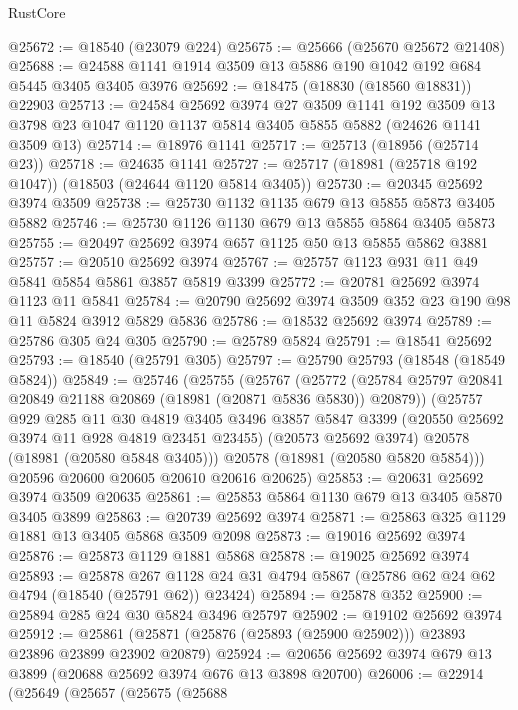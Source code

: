 \begin{lexlean}{RustCore}
\begin{coremodule}
@25672 := @18540 (@23079 @224)
@25675 := @25666 (@25670 @25672 @21408)
@25688 := @24588 @1141 @1914 @3509 @13 @5886 @190 @1042 @192 @684 @5445 @3405 @3405 @3976
@25692 := @18475 (@18830 (@18560 @18831)) @22903
@25713 := @24584
    @25692
    @3974
    @27
    @3509
    @1141
    @192
    @3509
    @13
    @3798
    @23
    @1047
    @1120
    @1137
    @5814
    @3405
    @5855
    @5882
    (@24626 @1141 @3509 @13)
@25714 := @18976 @1141
@25717 := @25713 (@18956 (@25714 @23))
@25718 := @24635 @1141
@25727 := @25717 (@18981 (@25718 @192 @1047)) (@18503 (@24644 @1120 @5814 @3405))
@25730 := @20345 @25692 @3974 @3509
@25738 := @25730 @1132 @1135 @679 @13 @5855 @5873 @3405 @5882
@25746 := @25730 @1126 @1130 @679 @13 @5855 @5864 @3405 @5873
@25755 := @20497 @25692 @3974 @657 @1125 @50 @13 @5855 @5862 @3881
@25757 := @20510 @25692 @3974
@25767 := @25757 @1123 @931 @11 @49 @5841 @5854 @5861 @3857 @5819 @3399
@25772 := @20781 @25692 @3974 @1123 @11 @5841
@25784 := @20790 @25692 @3974 @3509 @352 @23 @190 @98 @11 @5824 @3912 @5829 @5836
@25786 := @18532 @25692 @3974
@25789 := @25786 @305 @24 @305
@25790 := @25789 @5824
@25791 := @18541 @25692
@25793 := @18540 (@25791 @305)
@25797 := @25790 @25793 (@18548 (@18549 @5824))
@25849 := @25746
    (@25755
      (@25767
        (@25772 (@25784 @25797 @20841 @20849 @21188 @20869 (@18981 (@20871 @5836 @5830)) @20879))
        (@25757
          @929
          @285
          @11
          @30
          @4819
          @3405
          @3496
          @3857
          @5847
          @3399
          (@20550 @25692 @3974 @11 @928 @4819 @23451 @23455)
          (@20573 @25692 @3974)
          @20578
          (@18981 (@20580 @5848 @3405)))
        @20578
        (@18981 (@20580 @5820 @5854)))
      @20596
      @20600
      @20605
      @20610
      @20616
      @20625)
@25853 := @20631 @25692 @3974 @3509 @20635
@25861 := @25853 @5864 @1130 @679 @13 @3405 @5870 @3405 @3899
@25863 := @20739 @25692 @3974
@25871 := @25863 @325 @1129 @1881 @13 @3405 @5868 @3509 @2098
@25873 := @19016 @25692 @3974
@25876 := @25873 @1129 @1881 @5868
@25878 := @19025 @25692 @3974
@25893 := @25878
    @267
    @1128
    @24
    @31
    @4794
    @5867
    (@25786 @62 @24 @62 @4794 (@18540 (@25791 @62)) @23424)
@25894 := @25878 @352
@25900 := @25894 @285 @24 @30 @5824 @3496 @25797
@25902 := @19102 @25692 @3974
@25912 := @25861 (@25871 (@25876 (@25893 (@25900 @25902))) @23893 @23896 @23899 @23902 @20879)
@25924 := @20656 @25692 @3974 @679 @13 @3899 (@20688 @25692 @3974 @676 @13 @3898 @20700)
@26006 := @22914
    (@25649
      (@25657
        (@25675
          (@25688

\end{coremodule}
\end{lexlean}

